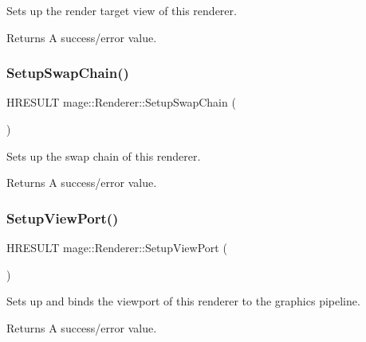 Sets up the render target view of this renderer.

\begin{DoxyReturn}{Returns}
A success/error value. 
\end{DoxyReturn}
\hypertarget{classmage_1_1_renderer_af2aa545594936261bf2639e4e0814a83}{}\label{classmage_1_1_renderer_af2aa545594936261bf2639e4e0814a83} 
\subsubsection{\texorpdfstring{Setup\+Swap\+Chain()}{SetupSwapChain()}}
{\footnotesize\ttfamily H\+R\+E\+S\+U\+LT mage\+::\+Renderer\+::\+Setup\+Swap\+Chain (\begin{DoxyParamCaption}{ }\end{DoxyParamCaption})\hspace{0.3cm}{\ttfamily [protected]}}

Sets up the swap chain of this renderer.

\begin{DoxyReturn}{Returns}
A success/error value. 
\end{DoxyReturn}
\hypertarget{classmage_1_1_renderer_a9bc8598ccca5f6e7cf99010175b1360b}{}\label{classmage_1_1_renderer_a9bc8598ccca5f6e7cf99010175b1360b} 
\subsubsection{\texorpdfstring{Setup\+View\+Port()}{SetupViewPort()}}
{\footnotesize\ttfamily H\+R\+E\+S\+U\+LT mage\+::\+Renderer\+::\+Setup\+View\+Port (\begin{DoxyParamCaption}{ }\end{DoxyParamCaption})\hspace{0.3cm}{\ttfamily [protected]}}

Sets up and binds the viewport of this renderer to the graphics pipeline.

\begin{DoxyReturn}{Returns}
A success/error value. 
\end{DoxyReturn}
\hypertarget{classmage_1_1_renderer_a9004ab608659188900c808eacb5f873c}{}\label{classmage_1_1_renderer_a9004ab608659188900c808eacb5f873c} 
